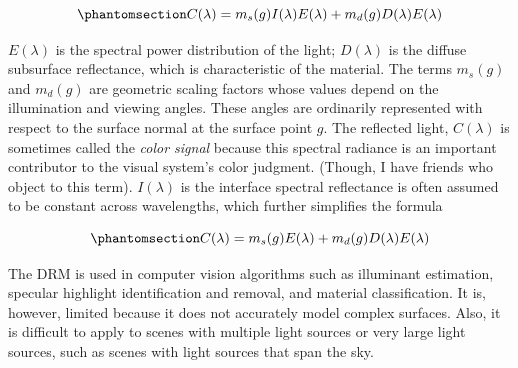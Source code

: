 \documentclass[
  letterpaper,
]{book}
\begin{document}
\begin{equation}\phantomsection\label{eq-DRM}{
C(\lambda) = m_s(g) I(\lambda) E(\lambda) + m_d(g) D(\lambda) E(\lambda)
}\end{equation}

\(E(\lambda)\) is the spectral power distribution of the light;
\(D(\lambda)\) is the diffuse subsurface reflectance, which is
characteristic of the material. The terms \(m_s(g)\) and \(m_d(g)\) are
geometric scaling factors whose values depend on the illumination and
viewing angles. These angles are ordinarily represented with respect to
the surface normal at the surface point \(g\). The reflected light,
\(C(\lambda)\) is sometimes called the \emph{color signal} because this
spectral radiance is an important contributor to the visual system's
color judgment. (Though, I have friends who object to this term).
\(I(\lambda)\) is the interface spectral reflectance is often assumed to
be constant across wavelengths, which further simplifies the formula

\begin{equation}\phantomsection\label{eq-DRM-simplified}{
C(\lambda) = m_s(g) E(\lambda) + m_d(g) D(\lambda) E(\lambda)
}\end{equation}

The DRM is used in computer vision algorithms such as illuminant
estimation, specular highlight identification and removal, and material
classification. It is, however, limited because it does not accurately
model complex surfaces. Also, it is difficult to apply to scenes with
multiple light sources or very large light sources, such as scenes with
light sources that span the sky.
\end{document}
